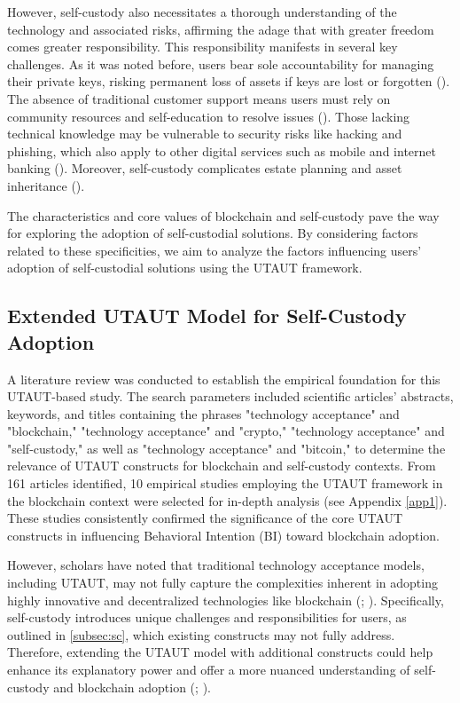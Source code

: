 \documentclass[twocolumn]{article}
\begin{document}
However, self-custody also necessitates a thorough understanding of the technology and associated risks, affirming the adage that with greater freedom comes greater responsibility. This responsibility manifests in several key challenges. As it was noted before, users bear sole accountability for managing their private keys, risking permanent loss of assets if keys are lost or forgotten (\cite{eskandari_first_2015}). The absence of traditional customer support means users must rely on community resources and self-education to resolve issues (\cite{conti_survey_2018}). Those lacking technical knowledge may be vulnerable to security risks like hacking and phishing, which also apply to other digital services such as mobile and internet banking (\cite{li_survey_2020}). Moreover, self-custody complicates estate planning and asset inheritance (\cite{katuk_cryptocurrency_2023}).

The characteristics and core values of blockchain and self-custody pave the way for exploring the adoption of self-custodial solutions. By considering factors related to these specificities, we aim to analyze the factors influencing users' adoption of self-custodial solutions using the UTAUT framework.


\subsection{Extended UTAUT Model for Self-Custody Adoption}

A literature review was conducted to establish the empirical foundation for this UTAUT-based study. The search parameters included scientific articles' abstracts, keywords, and titles containing the phrases "technology acceptance" and "blockchain," "technology acceptance" and "crypto," "technology acceptance" and "self-custody," as well as "technology acceptance" and "bitcoin," to determine the relevance of UTAUT constructs for blockchain and self-custody contexts. From 161 articles identified, 10 empirical studies employing the UTAUT framework in the blockchain context were selected for in-depth analysis (see Appendix \ref{app1}). These studies consistently confirmed the significance of the core UTAUT constructs in influencing Behavioral Intention (BI) toward blockchain adoption.

However, scholars have noted that traditional technology acceptance models, including UTAUT, may not fully capture the complexities inherent in adopting highly innovative and decentralized technologies like blockchain (\cite{alomari_factors_2023}; \cite{lampo_how_2022}). Specifically, self-custody introduces unique challenges and responsibilities for users, as outlined in \ref{subsec:sc}, which existing constructs may not fully address. Therefore, extending the UTAUT model with additional constructs could help enhance its explanatory power and offer a more nuanced understanding of self-custody and blockchain adoption (\cite{chang_acceptance_2022}; \cite{ng_factors_2021}).
\end{document}
